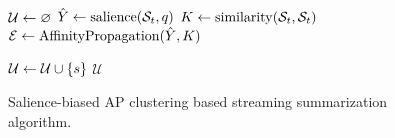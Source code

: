 \begin{figure}
\begin{algorithmic}[1] 
  \State $\mathcal{U} \gets \varnothing$ 
    \State $\hat{Y} \gets \operatorname{salience}(\mathcal{S}_t, q)$
    \State $K \gets \operatorname{similarity}(
           \mathcal{S}_t, \mathcal{S}_t)$ 
    \State $\mathcal{E} \gets \operatorname{AffinityPropagation}(\hat{Y}, K)$ 

    \For{$\strsent \in \exemplars$}
        \State $\mathcal{U} \gets \mathcal{U} \cup \{s\}$
      \EndIf
    \EndFor
  \EndFor
  \State \Return $\mathcal{U}$
\EndProcedure
\end{algorithmic}
    \caption{Salience-biased AP clustering based streaming summarization 
             algorithm.}
    \label{alg:ts_sap_algo}
\end{figure}


